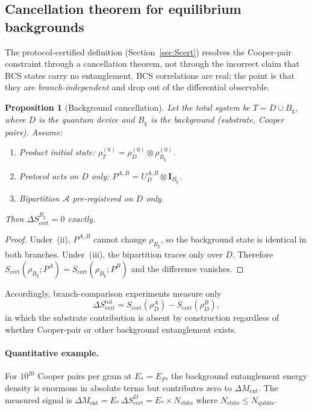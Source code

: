 \documentclass[11pt]{article}
\theoremstyle{plain}
\newtheorem{proposition}{Proposition}[section]
\theoremstyle{definition}
\theoremstyle{remark}
\begin{document}
\subsection{Cancellation theorem for equilibrium backgrounds}
\label{sec:cancellation}

The protocol-certified definition (Section~\ref{sec:Scert}) resolves the Cooper-pair
constraint through a cancellation theorem, not through the incorrect claim that BCS states
carry no entanglement.  BCS correlations are real; the point is that they are
\emph{branch-independent} and drop out of the differential observable.

\begin{proposition}[Background cancellation]\label{prop:cancel}
Let the total system be $T = D \cup B_{\mathrm{g}}$, where $D$ is the quantum device
and $B_{\mathrm{g}}$ is the background (substrate, Cooper pairs). Assume:
\begin{enumerate}[label=(\roman*),noitemsep]
\item Product initial state: $\rho_T^{(0)} = \rho_D^{(0)} \otimes \rho_{B_{\mathrm{g}}}^{(0)}$.
\item Protocol acts on $D$ only: $P^{A,B} = U_D^{A,B} \otimes \mathbf{I}_{B_{\mathrm{g}}}$.
\item Bipartition $\mathcal{A}$ pre-registered on $D$ only.
\end{enumerate}
Then $\Delta S_{\mathrm{cert}}^{B_{\mathrm{g}}} = 0$ exactly.
\end{proposition}

\begin{proof}
Under~(ii), $P^{A,B}$ cannot change $\rho_{B_{\mathrm{g}}}$, so the background state is
identical in both branches. Under~(iii), the bipartition traces only over $D$. Therefore
$S_{\mathrm{cert}}(\rho_{B_{\mathrm{g}}}; P^A) = S_{\mathrm{cert}}(\rho_{B_{\mathrm{g}}}; P^B)$
and the difference vanishes.
\end{proof}

Accordingly, branch-comparison experiments measure only
\begin{equation}
\Delta S_{\mathrm{cert}}^{\mathrm{tot}}
= S_{\mathrm{cert}}(\rho_D^A) - S_{\mathrm{cert}}(\rho_D^B),
\end{equation}
in which the substrate contribution is absent by construction regardless of whether Cooper-pair
or other background entanglement exists.

\paragraph{Quantitative example.}
For $10^{20}$ Cooper pairs per gram at $E_* = E_P$, the background entanglement energy density
is enormous in absolute terms but contributes zero to $\Delta M_{\mathrm{ent}}$.  The measured
signal is $\Delta M_{\mathrm{ent}} = E_*\,\Delta S_{\mathrm{cert}}^D = E_*\times N_{\mathrm{ebits}}$
where $N_{\mathrm{ebits}} \leq N_{\mathrm{qubits}}$.
\end{document}
